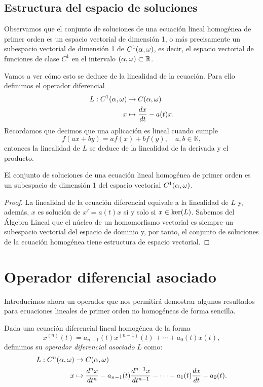 \documentclass[../ecuaciones_diferenciales.tex]{subfiles}
\begin{document}
\subsection{Estructura del espacio de soluciones}

Observamos que el conjunto de soluciones de una ecuación lineal homogénea de
primer orden es un espacio vectorial de dimensión 1, o más precisamente un
subespacio vectorial de dimensión 1 de \(C^1\openopen{\alpha}{\omega}\), es decir, el
espacio vectorial de funciones de clase \(C^1\) en el intervalo
\(\openopen{\alpha}{\omega} \subset \R\).

Vamos a ver cómo esto se deduce de la linealidad de la ecuación. Para ello
definimos el operador diferencial
\begin{align*}
	L : C^1\openopen{\alpha}{\omega} & \to C\openopen{\alpha}{\omega} \\
	x                       & \mapsto \frac{d x}{\dif t} - a(t)x.
\end{align*}
Recordamos que decimos que una aplicación es lineal cuando cumple
\[f(ax + by) = af(x) + bf(y), \quad a, b \in \mathbb{K},\] entonces la
linealidad de \(L\) se deduce de la linealidad de la derivada y el producto.

\begin{theorem}
	El conjunto de soluciones de una ecuación lineal homogénea de
	primer orden es un subespacio de dimensión 1 del espacio vectorial
	\(C^1\openopen{\alpha}{\omega}\).
\end{theorem}

\begin{proof}
	La linealidad de la ecuación diferencial equivale a la linealidad de \(L\)
	y, además, \(x\) es solución de \(x' = a(t)x\) si y solo si
	\(x \in \lker{L}\). Sabemos del Álgebra Lineal que el núcleo de un
	homomorfismo vectorial es siempre un subespacio vectorial del espacio de
	dominio y, por tanto, el conjunto de soluciones de la ecuación homogénea
	tiene estructura de espacio vectorial.
\end{proof}

\section{Operador diferencial asociado}

Introducimos ahora un operador que nos permitirá demostrar algunos resultados
para ecuaciones lineales de primer orden no homogéneas de forma sencilla.

\begin{definition}
	Dada una ecuación diferencial lineal homogénea de la forma
	\[x^{(n)}(t) = a_{n-1}(t)x^{(n - 1)}(t) + \cdots + a_0(t)x(t),\]
	definimos su \emph{operador diferencial asociado}
	\(L\) como:
	\begin{align*}
		L : C^n(\alpha, \omega) &\to C(\alpha, \omega) \\
		x &\mapsto \frac{d^n x}{\mathop{d\!} t^n} - a_{n-1}(t)\frac{d^{n-1} x}{\mathop{d\!} t^{n-1}}
		- \cdots - a_1(t)\frac{d x}{\mathop{d\!} t} - a_0(t).
	\end{align*}
\end{definition}
\end{document}
